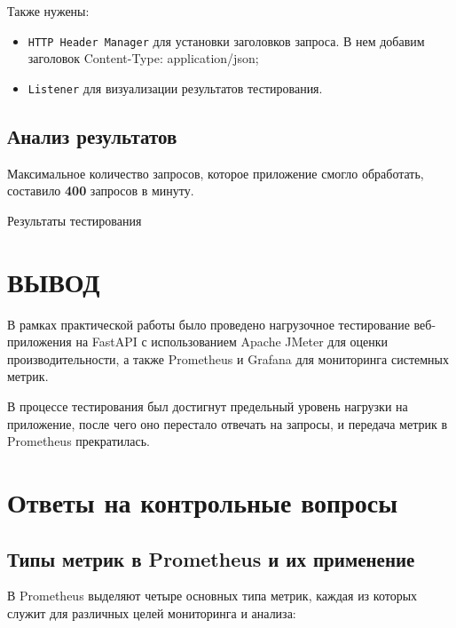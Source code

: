 Также нужены:

\begin{itemize}
    \item \texttt{HTTP Header Manager} для установки заголовков запроса.
    В нем добавим заголовок Content-Type: application/json;
    \item \texttt{Listener} для визуализации результатов тестирования.
\end{itemize}

\subsection{Анализ результатов}

Максимальное количество запросов, которое приложение смогло обработать, составило \textbf{400} запросов в минуту.

\begin{image}
    \caption{Результаты тестирования}
    \label{fig:run}
\end{image}

\clearpage

\section*{\LARGE ВЫВОД}

В рамках практической работы было проведено нагрузочное тестирование веб-приложения на FastAPI с использованием
Apache JMeter для оценки производительности, а также Prometheus и Grafana для мониторинга системных метрик.
\par
В процессе тестирования был достигнут предельный уровень нагрузки на приложение, после чего оно перестало отвечать
на запросы, и передача метрик в Prometheus прекратилась.

\clearpage


\section{Ответы на контрольные вопросы}

\subsection{Типы метрик в Prometheus и их применение}

В Prometheus выделяют четыре основных типа метрик, каждая из которых служит для различных целей мониторинга и анализа:



